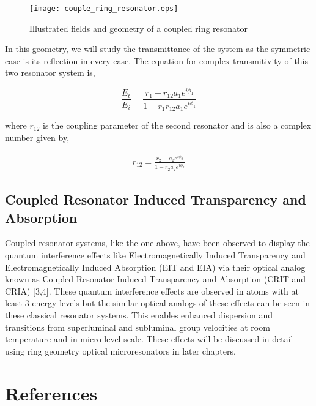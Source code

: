 \begin{figure}[h]
\centering
\texttt{[image: couple\_ring\_resonator.eps]}
\caption{Illustrated fields and geometry of a coupled ring resonator}
\end{figure}

In this geometry, we will study the transmittance of the system as the symmetric case is its reflection in every case. The equation for complex transmitivity of this two resonator system is,

\begin{equation}
\frac{E_{t}}{E_{i}} = \frac{r_{1} - r_{12} a_{1} e^{i\phi_{1}}}{1 - r_{1} r_{12} a_{1} e^{i\phi_{1}}}
\end{equation}

where $r_{12}$ is the coupling parameter of the second resonator and is also a complex number given by,

\begin{align*}
r_{12} = \frac{r_{2} - a_{2} e^{i\phi_{2}}}{1 - r_{2} a_{2} e^{i\phi_{2}}}
\end{align*}


\subsection{Coupled Resonator Induced Transparency and Absorption}
Coupled resonator systems, like the one above, have been observed to display the quantum interference effects like Electromagnetically Induced Transparency and Electromagnetically Induced Absorption (EIT and EIA) via their optical analog known as Coupled Resonator Induced Transparency and Absorption (CRIT and CRIA) [3,4]. These quantum interference effects are observed in atoms with at least 3 energy levels but the similar optical analogs of these effects can be seen in these classical resonator systems. This enables enhanced dispersion and transitions from superluminal and subluminal group velocities at room temperature and in micro level scale. These effects will be discussed in detail using ring geometry optical microresonators in later chapters.

\newpage
\section*{References}
